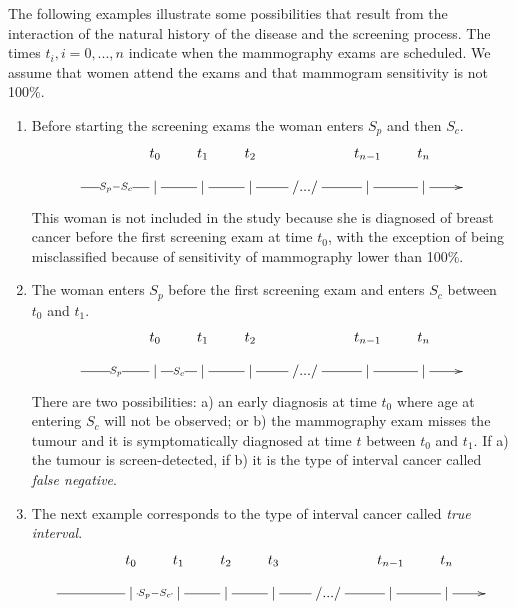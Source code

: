 \documentclass{bmcart}
\begin{document}
The following examples illustrate some possibilities that result from the interaction of the
natural history of the disease and the screening process. The times $t_i, i=0,..., n$ indicate when
the mammography exams are scheduled. We assume that women attend the exams and that mammogram
sensitivity is not 100\%. 

\begin{enumerate}
  \item Before starting the screening exams the woman enters $S_p$ and then $S_c$. 
\begin{displaymath}
\xymatrix @R=0.3cm @C=0.7cm {
& & t_0 & t_1 & t_2 &   & t_{n-1} & t_n \\
\ar@{-}[rr]|{S_p-S_c} & & | \ar@{-}[r] & | \ar@{-}[r] & | \ar@{-}[r] &  /.../ \ar@{-}[r] & | \ar@{-}[r] & | \ar@{->}[r] & \\
}
\end{displaymath}
This woman is not included in the study because she is diagnosed of breast cancer before the first
screening exam at time $t_0$, with the exception of being misclassified because of sensitivity of
mammography lower than 100\%.
  \item The woman enters $S_p$ before the first screening exam and enters $S_c$ between $t_0$ and
  $t_1$.
\begin{displaymath}
\xymatrix @R=0.3cm @C=0.7cm {
& & t_0 & t_1 & t_2 &  & t_{n-1} & t_n \\
\ar@{-}[rr]|{S_p} & & | \ar@{-}[r]|{S_c} & | \ar@{-}[r] & | \ar@{-}[r] & /.../ \ar@{-}[r] & | \ar@{-}[r] & | \ar@{->}[r] & \\
}
\end{displaymath}
There are two possibilities: a) an early diagnosis at time $t_0$ where age at entering $S_c$ will
not be observed; or b) the mammography exam misses the tumour and it is symptomatically diagnosed
at time $t$ between $t_0$ and $t_1$. If a) the tumour is screen-detected, if b) it is the type of
interval cancer called \textit{false negative}.
  \item The next example corresponds to the type of interval cancer called \textit{true interval}.
\begin{displaymath}
\xymatrix @R=0.3cm @C=0.7cm {
& & t_0 & t_1 & t_2 & t_3 &  & t_{n-1} & t_n \\
\ar@{-}[rr] & & | \ar@{-}[r]|{S_p-S_c} & | \ar@{-}[r] & | \ar@{-}[r] & | \ar@{-}[r] & /.../ \ar@{-}[r] & | \ar@{-}[r] & | \ar@{->}[r] & \\
}
\end{displaymath}
\end{enumerate}
\end{document}
